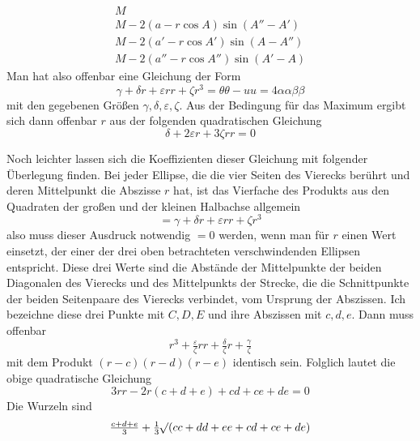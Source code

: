 %
\[
\begin{array}{l}
M\\
M-2(a-r\cos A)\sin(A''-A')\\
M-2(a'-r\cos A')\sin(A-A'')\\
M-2(a''-r\cos A'')\sin(A'-A)
\end{array}
\]
Man hat also offenbar eine Gleichung der Form
\[
\gamma+\delta r+\varepsilon rr+\zeta r^3=\theta\theta-uu=4\alpha\alpha\beta\beta
\]
mit den gegebenen Größen \(\gamma,\delta,\varepsilon,\zeta\). Aus der Bedingung für das Maximum ergibt sich dann offenbar \(r\) aus der folgenden quadratischen Gleichung
\[
\delta+2\varepsilon r+3\zeta rr=0
\]
\par
Noch leichter lassen sich die Koeffizienten dieser Gleichung mit folgender Überlegung finden. Bei jeder Ellipse, die die vier Seiten des Vierecks berührt und deren Mittelpunkt die Abszisse \(r\) hat, ist das Vierfache des Produkts aus den Quadraten der großen und der kleinen Halbachse allgemein
\[
=\gamma+\delta r+\varepsilon rr+\zeta r^3
\]
also muss dieser Ausdruck notwendig \(=0\) werden, wenn man für \(r\) einen Wert einsetzt, der einer der drei oben betrachteten verschwindenden Ellipsen entspricht. Diese drei Werte sind die Abstände der Mittelpunkte der beiden Diagonalen des Vierecks und des Mittelpunkts der Strecke, die die Schnittpunkte der beiden Seitenpaare des Vierecks verbindet, vom Ursprung der Abszissen. Ich bezeichne diese drei Punkte mit \(C,D,E\) und ihre Abszissen mit \(c,d,e\). Dann muss offenbar
\[
r^3+\tfrac{\varepsilon}{\zeta}rr+\tfrac{\delta}{\zeta}r+\tfrac{\gamma}{\zeta}
\]
mit dem Produkt \((r-c)(r-d)(r-e)\) identisch sein. Folglich lautet die obige quadratische Gleichung
\[
3rr-2r(c+d+e)+cd+ce+de=0
\]
Die Wurzeln sind
\[
\tfrac{c+d+e}{3}+\tfrac13\mathord{{}^{}\!\surd}(cc+dd+ee+cd+ce+de)
\]
